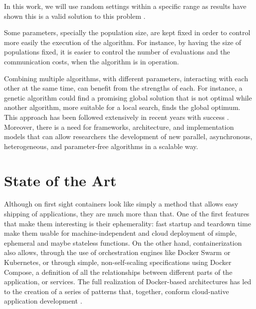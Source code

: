 \documentclass[review]{elsarticle}
\begin{document}
In this work, we will use random settings within a specific range as results have shown
this is a valid solution to this problem \cite{garcia2014randomized}. %

Some parameters, specially the population size, are
kept fixed in order to control more easily the execution of the algorithm. For
instance, by having the size of populations fixed, it is easier to control
the number of evaluations and the communication costs, when the algorithm is in
operation. %

Combining multiple algorithms, with different parameters, interacting with each
other at the same time, can benefit from the strengths of each. For instance, a
genetic algorithm could find a promising global solution that is not optimal
while another algorithm, more suitable for a local search, finds the global
optimum. This approach has been followed extensively in recent years with
success \cite{li2015multi,godio2016multi,biswas2014co}. %
Moreover, there is a need for frameworks, architecture, and
implementation models that can allow researchers the development of new
parallel, asynchronous, heterogeneous, and parameter-free algorithms in a scalable way.  

\section{State of the Art} 
\label{soa}

Although on first sight containers look like simply a method that
allows easy shipping of applications, they are much more than
that. One of the first features that make them interesting is their
ephemerality: fast startup and teardown time make them usable for
machine-independent and cloud deployment of simple, ephemeral and
maybe stateless functions. On the other hand, containerization also
allows, through the use of orchestration engines like Docker Swarm or
Kubernetes, or through simple, non-self-scaling specifications using
Docker Compose, a definition of all the relationships between
different parts of the application, or services. The full realization
of Docker-based architectures has led to the creation of a series of
patterns that, together, conform cloud-native application development
\cite{kratzke2017understanding}.
\end{document}
